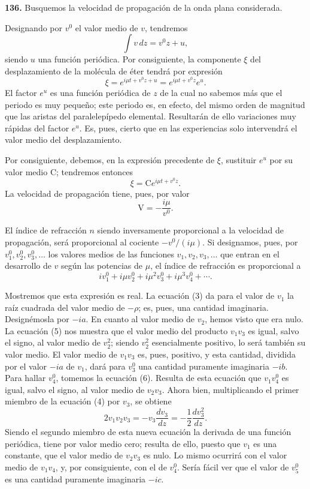 \noindent\textbf{136.} Busquemos la velocidad de propagación de la onda
plana considerada.

Designando por $v^0$ el valor medio de $v$, tendremos
\[
\int v\,dz=v^0z+u,
\]
siendo $u$ una función periódica. Por consiguiente, la componente $\xi$ del
desplazamiento de la molécula de éter tendrá por expresión
\[
\xi=e^{i\mu t+v^0z+u}=e^{i\mu t+v^0z}e^u.
\]
El factor $e^u$ es una función periódica de $z$ de la cual no sabemos más
que el periodo es muy pequeño; este periodo es, en efecto, del mismo orden
de magnitud que las aristas del paralelepípedo elemental. Resultarán de
ello variaciones muy rápidas del factor $e^u$. Es, pues, cierto que en las
experiencias solo intervendrá el valor medio del desplazamiento.

Por consiguiente, debemos, en la expresión precedente de $\xi$, sustituir
$e^u$ por su valor medio $\mathrm C$; tendremos entonces
\[
\xi=\mathrm Ce^{i\mu t+v^0z}.
\]
La velocidad de propagación tiene, pues, por valor
\[
\mathrm V=-\frac{i\mu}{v^0}.
\]

El índice de refracción $n$ siendo inversamente proporcional a la
velocidad de propagación, será proporcional al cociente $-v^0/(i\mu)$. Si
designamos, pues, por $v^0_1,v^0_2,v^0_3,\ldots$ los valores medios de las
funciones $v_1,v_2,v_3,\ldots$ que entran en el desarrollo de $v$ según
las potencias de $\mu$, el índice de refracción es proporcional a
\[
iv_1^0+i\mu v_2^0+i\mu^2v_3^0+i\mu^3v_4^0+\cdots.
\]

Mostremos que esta expresión es real. La ecuación (3) da para el valor de
$v_1$ la raíz cuadrada del valor medio de $-\rho$; es, pues, una cantidad
imaginaria. Designémosla por $-ia$. En cuanto al valor medio de $v_2$,
hemos visto que era nulo. La ecuación (5) nos muestra que el valor medio
del producto $v_1v_3$ es igual, salvo el signo, al valor medio de
$v_2^2$; siendo $v_2^2$ esencialmente positivo, lo será también su valor
medio. El valor medio de $v_1v_3$ es, pues, positivo, y esta cantidad,
dividida por el valor $-ia$ de $v_1$, dará para $v_3^0$ una cantidad
puramente imaginaria $-ib$. Para hallar $v_4^0$, tomemos la ecuación (6).
Resulta de esta ecuación que $v_1v_4^0$ es igual, salvo el signo, al
valor medio de $v_2v_3$. Ahora bien, multiplicando el primer miembro de la
ecuación (4) por $v_3$, se obtiene
\[
2v_1v_2v_3=-v_3\frac{dv_3}{dz}=-\frac12\frac{dv_3^2}{dz}.
\]
Siendo el segundo miembro de esta nueva ecuación la derivada de una
función periódica, tiene por valor medio cero; resulta de ello, puesto que
$v_1$ es una constante, que el valor medio de $v_2v_3$ es nulo. Lo mismo
ocurrirá con el valor medio de $v_1v_4$, y, por consiguiente, con el de
$v_4^0$. Sería fácil ver que el valor de $v_5^0$ es una cantidad
puramente imaginaria $-ic$.

